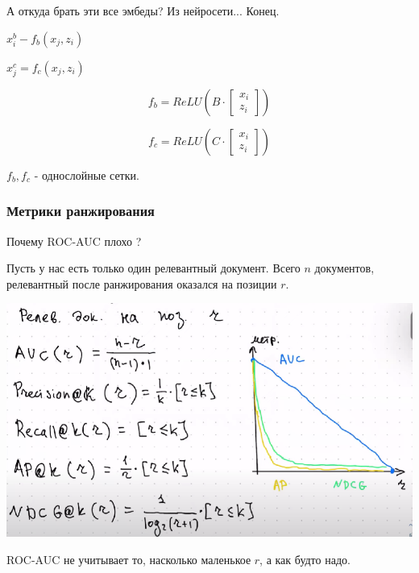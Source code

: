 \documentclass[a4paper]{article}
\begin{document}
А откуда брать эти все эмбеды? Из нейросети... Конец.

$x_i^b - f_b(x_j, z_i)$

$x_j^c = f_c(x_j, z_i)$

\[ f_b = ReLU \left( B \cdot \begin{bmatrix} x_i \\ z_i \end{bmatrix} \right) \]

\[ f_c = ReLU \left( C \cdot \begin{bmatrix} x_i \\ z_i \end{bmatrix} \right) \]

$f_b, f_c$ - однослойные сетки.

\subsubsection*{Метрики ранжирования}

Почему ROC-AUC плохо ?


Пусть у нас есть только один релевантный документ. Всего $n$ документов, релевантный после ранжирования оказался на позиции $r$.

\includegraphics[width=14cm]{metrics.png}

ROC-AUC не учитывает то, насколько маленькое $r$, а как будто надо.
\end{document}
